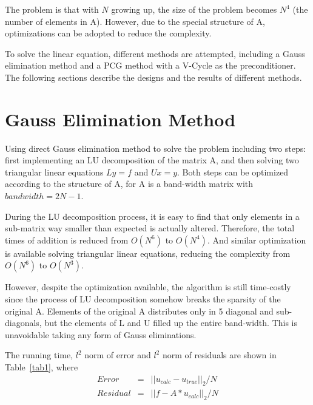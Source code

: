 \documentclass{article}
\begin{document}
The problem is that with $N$ growing up, the size of the problem becomes $N^4$ (the number of elements in A). However, due to the special structure of A, optimizations can be adopted to reduce the complexity.

To solve the linear equation, different methods are attempted, including a Gauss elimination method and a PCG method with a V-Cycle as the preconditioner. The following sections describe the designs and the results of different methods.

\section{Gauss Elimination Method}

Using direct Gauss elimination method to solve the problem including two steps: first implementing an LU decomposition of the matrix A, and then solving two triangular linear equations $Ly=f$ and $Ux=y$. Both steps can be optimized according to the structure of A, for A is a band-width matrix with $bandwidth=2N-1$.

During the LU decomposition process, it is easy to find that only elements in a sub-matrix way smaller than expected is actually altered. Therefore, the total times of addition is reduced from $O(N^6)$ to $O(N^4)$. And similar optimization is available solving triangular linear equations, reducing the complexity from $O(N^6)$ to $O(N^3)$.

However, despite the optimization available, the algorithm is still time-costly since the process of LU decomposition somehow breaks the sparsity of the original A. Elements of the original A distributes only in 5 diagonal and sub-diagonals, but the elements of L and U filled up the entire band-width. This is unavoidable taking any form of Gauss eliminations.

The running time, $l^2$ norm of error and $l^2$ norm of residuals are shown in Table~\ref{tab1}, where
\begin{eqnarray*}
  Error &=& ||u_{calc}-u_{true}||_2/N \\
  Residual &=& ||f-A*u_{calc}||_2/N
\end{eqnarray*}
\end{document}

